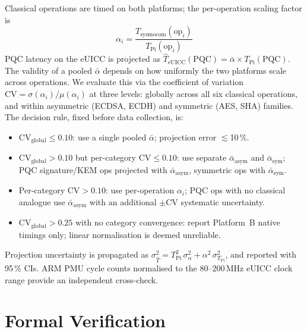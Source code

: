 \documentclass[final,3p,times,twocolumn]{elsarticle}
\begin{document}
Classical operations are timed on both platforms; the per-operation scaling
factor is
\begin{equation}
\alpha_{i} = \frac{T_{\text{sysmocom}}(\text{op}_{i})}{T_{\text{Pi}}(\text{op}_{i})}
\end{equation}
PQC latency on the eUICC is projected as
$\hat{T}_{\text{eUICC}}(\text{PQC}) = \bar{\alpha} \times T_{\text{Pi}}(\text{PQC})$.
The validity of a pooled $\bar{\alpha}$ depends on how uniformly the two
platforms scale across operations.  We evaluate this via the coefficient of
variation $\text{CV} = \sigma(\alpha_i)/\mu(\alpha_i)$ at three levels:
globally across all six classical operations, and within asymmetric (ECDSA,
ECDH) and symmetric (AES, SHA) families.  The decision rule, fixed before
data collection, is:

\begin{itemize}[leftmargin=*, noitemsep, topsep=2pt]
  \item $\text{CV}_{\text{global}} \leq 0.10$: use a single pooled
        $\bar{\alpha}$; projection error $\lesssim$10\,\%.
  \item $\text{CV}_{\text{global}} > 0.10$ but per-category
        $\text{CV} \leq 0.10$: use separate $\bar{\alpha}_{\text{asym}}$
        and $\bar{\alpha}_{\text{sym}}$; PQC signature/KEM ops projected
        with $\bar{\alpha}_{\text{asym}}$, symmetric ops with
        $\bar{\alpha}_{\text{sym}}$.
  \item Per-category $\text{CV} > 0.10$: use per-operation $\alpha_i$;
        PQC ops with no classical analogue use
        $\bar{\alpha}_{\text{asym}}$ with an additional
        $\pm\text{CV}$ systematic uncertainty.
  \item $\text{CV}_{\text{global}} > 0.25$ with no category convergence:
        report Platform~B native timings only; linear normalisation is
        deemed unreliable.
\end{itemize}

\noindent Projection uncertainty is propagated as
$\sigma_{\hat{T}}^{2} = T_{\text{Pi}}^{2}\,\sigma_{\alpha}^{2} +
\alpha^{2}\,\sigma_{T_{\text{Pi}}}^{2}$, and reported with 95\,\% CIs.
ARM PMU cycle counts normalised to the 80--200\,MHz eUICC clock range
provide an independent cross-check.

\section{Formal Verification}\label{sec:formal}
\end{document}
